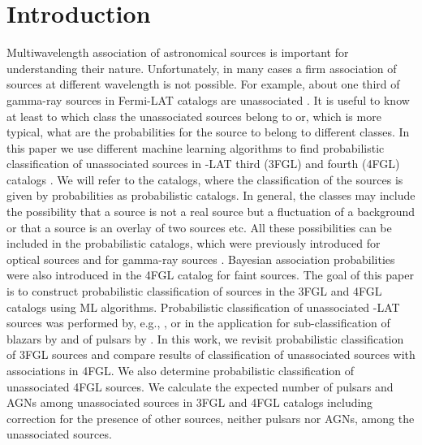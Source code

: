 \section{Introduction}

Multiwavelength association of astronomical sources is important for understanding their nature.
Unfortunately, in many cases a firm association of sources at different wavelength is not possible.
For example, about one third of gamma-ray sources in Fermi-LAT catalogs are unassociated
\citep{2010ApJS..188..405A, 2012ApJS..199...31N, 2015ApJS..218...23A, 2020ApJS..247...33A}.
It is useful to know at least to which class the unassociated sources belong to or, which is more typical,
what are the probabilities for the source to belong to different classes.
In this paper we use different machine learning algorithms to find probabilistic classification of
unassociated sources in \Fermi-LAT third (3FGL) and fourth (4FGL) catalogs \citep{2015ApJS..218...23A, 2020ApJS..247...33A}.
We will refer to the catalogs, where the classification of the sources is given by probabilities as probabilistic catalogs.
In general, the classes may include the possibility that a source is not a real source but a fluctuation of a background 
or that a source is an overlay of two sources etc.
All these possibilities can be included in the probabilistic catalogs, which were previously introduced for optical sources 
\citep[e.g.,][]{2010EAS....45..351H, 2013AJ....146....7B}
and for gamma-ray sources \citep{2017ApJ...839....4D}.
Bayesian association probabilities were also introduced in the 4FGL catalog \citep{2020ApJS..247...33A} for faint sources.
The goal of this paper is to construct probabilistic classification of sources in the 3FGL and 4FGL catalogs using ML algorithms.
Probabilistic classification of unassociated \Fermi-LAT sources was performed by, e.g.,
\cite{2012ApJ...753...83A, 2016ApJ...820....8S, 2016ApJ...825...69M, 2017A&A...602A..86L, 2020MNRAS.492.5377L, 2020arXiv200106010Z},
or in the application for sub-classification of blazars by
\cite{2013MNRAS.428..220H, 2014ApJ...782...41D, 2016MNRAS.462.3180C, 2017MNRAS.470.1291S, 2019MNRAS.490.4770K, 2020MNRAS.493.1926K}
and of pulsars by \cite{2012MNRAS.424.2832L, 2016ApJ...820....8S}.
In this work, we revisit probabilistic classification of 3FGL sources and compare results of classification of unassociated sources
with associations in 4FGL.
We also determine probabilistic classification of unassociated 4FGL sources.
We calculate the expected number of pulsars and AGNs among unassociated sources in 3FGL and 4FGL catalogs
including correction for the presence of other sources, neither pulsars nor AGNs, among the unassociated sources.


